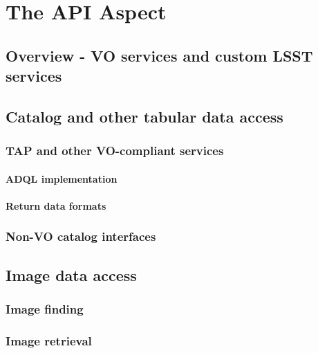 \section{The API Aspect}\label{api-aspect}

\subsection{Overview - VO services and custom LSST services}\label{api-overview}

\subsection{Catalog and other tabular data access}\label{catalog-and-other-tabular-data-access}

\subsubsection{TAP and other VO-compliant services}\label{tap-and-other-vo-compliant-services}

\paragraph{ADQL implementation}\label{adql-implementation}

\paragraph{Return data formats}\label{return-data-formats}

\subsubsection{Non-VO catalog interfaces}\label{non-vo-catalog-interfaces}

\subsection{Image data access}\label{image-data-access}

\subsubsection{Image finding}\label{image-finding}

\subsubsection{Image retrieval}\label{image-retrieval}

